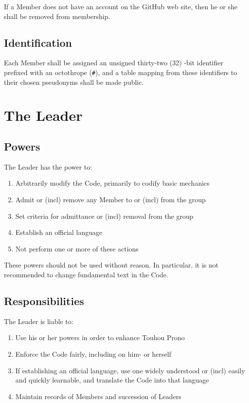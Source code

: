 \documentclass[10pt]{book}
\begin{document}
If a Member does not have an account on the GitHub web site, then he or she shall be removed from membership.

\subsection{Identification}

Each Member shall be assigned an unsigned thirty-two (32) -bit identifier prefixed with an octothrope (\texttt{\#}), and a table mapping from these identifiers to their chosen pseudonyms shall be made public.

\section{The Leader}
\label{sec:leader}

\subsection{Powers}

The Leader has the power to:

\begin{enumerate}
 \item Arbitrarily modify the Code, primarily to codify basic mechanics
 \item Admit or (incl) remove any Member to or (incl) from the group
 \item Set criteria for admittance or (incl) removal from the group
 \item Establish an official language
 \item Not perform one or more of these actions
\end{enumerate}

These powers should not be used without reason. In particular, it is not recommended to change fundamental text in the Code.

\subsection{Responsibilities}

The Leader is liable to:

\begin{enumerate}
 \item Use his or her powers in order to enhance Touhou Prono
 \item Enforce the Code fairly, including on him- or herself
 \item If establishing an official language, use one widely understood or (incl) easily and quickly learnable, and translate the Code into that language
 \item Maintain records of Members and succession of Leaders
\end{enumerate}
\end{document}
